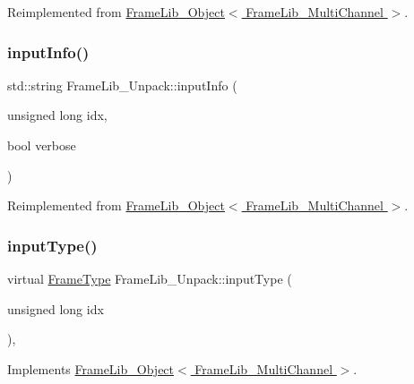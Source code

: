 Reimplemented from \hyperlink{class_frame_lib___object_aaebb53211e0617e9203d1088c2fcb9c2}{Frame\+Lib\+\_\+\+Object$<$ Frame\+Lib\+\_\+\+Multi\+Channel $>$}.

\mbox{\label{class_frame_lib___unpack_a1ee09b9d9ab16f598f3462d9b29533be}} 
\subsubsection{\texorpdfstring{input\+Info()}{inputInfo()}}
{\footnotesize\ttfamily std\+::string Frame\+Lib\+\_\+\+Unpack\+::input\+Info (\begin{DoxyParamCaption}\item[{unsigned long}]{idx,  }\item[{bool}]{verbose }\end{DoxyParamCaption})\hspace{0.3cm}{\ttfamily [virtual]}}



Reimplemented from \hyperlink{class_frame_lib___object_a49abea5f18125c425b1eae8710735891}{Frame\+Lib\+\_\+\+Object$<$ Frame\+Lib\+\_\+\+Multi\+Channel $>$}.

\mbox{\label{class_frame_lib___unpack_a003ea8257f11fe375cc9bf2e6b5a8db1}} 
\subsubsection{\texorpdfstring{input\+Type()}{inputType()}}
{\footnotesize\ttfamily virtual \hyperlink{_frame_lib___types_8h_ad495a9f61af7fff07d7e97979d1ab854}{Frame\+Type} Frame\+Lib\+\_\+\+Unpack\+::input\+Type (\begin{DoxyParamCaption}\item[{unsigned long}]{idx }\end{DoxyParamCaption})\hspace{0.3cm}{\ttfamily [inline]}, {\ttfamily [virtual]}}



Implements \hyperlink{class_frame_lib___object_a6c5d94f1577471d33204078e86f51ff3}{Frame\+Lib\+\_\+\+Object$<$ Frame\+Lib\+\_\+\+Multi\+Channel $>$}.

